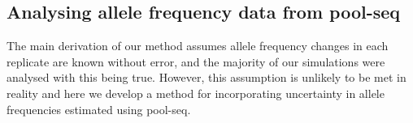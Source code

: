 \documentclass[12pt]{article}
\begin{document}
\begin{bibunit}






\section{Analysing allele frequency data from pool-seq}
\label{App:pool-seq}

The main derivation of our method assumes allele frequency changes in each replicate are known without error, and the majority of our simulations were analysed with this being true. However, this assumption is unlikely to be met in reality and here we develop a method for incorporating uncertainty in allele frequencies estimated using pool-seq.


\end{bibunit}
\end{document}
